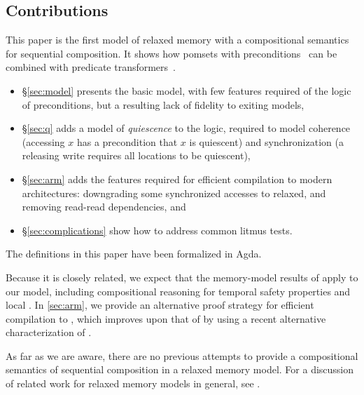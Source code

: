 \subsection{Contributions}

This paper is the first model of relaxed memory with a compositional
semantics for sequential composition.  It shows how pomsets with
preconditions~\cite{DBLP:journals/pacmpl/JagadeesanJR20} can be combined
with predicate transformers~\cite{DBLP:journals/cacm/Dijkstra75}.
\begin{itemize}
\item \S\ref{sec:model} presents the basic model, with few features
  required of the logic of preconditions, but a resulting lack of fidelity
  to exiting models,
\item \S\ref{sec:q} adds a model of \emph{quiescence} to the logic,
  required to model coherence (accessing $x$ has a precondition that $x$ is quiescent)
  and synchronization (a releasing write requires all locations to be quiescent),
\item \S\ref{sec:arm} adds the features required for efficient compilation
  to modern architectures: downgrading some synchronized accesses to relaxed,
  and removing read-read dependencies, and
\item \S\ref{sec:complications} show how to address common litmus tests.
\end{itemize}
The definitions in this paper have been formalized in Agda.

Because it is closely related, we expect that the memory-model results of
\cite{DBLP:journals/pacmpl/JagadeesanJR20} apply to our model, including
compositional reasoning for temporal safety properties and {local} \drfsc.
In \textsection\ref{sec:arm}, we provide an alternative proof strategy for
efficient compilation to \armeight{}, which improves upon that of
\cite{DBLP:journals/pacmpl/JagadeesanJR20} by using a recent alternative
characterization of \armeight{}.

As far as we are aware, there are no previous attempts to provide a
compositional semantics of sequential composition in a relaxed memory model.
For a discussion of related work for relaxed memory models in general, see
\cite{DBLP:journals/pacmpl/JagadeesanJR20}.
